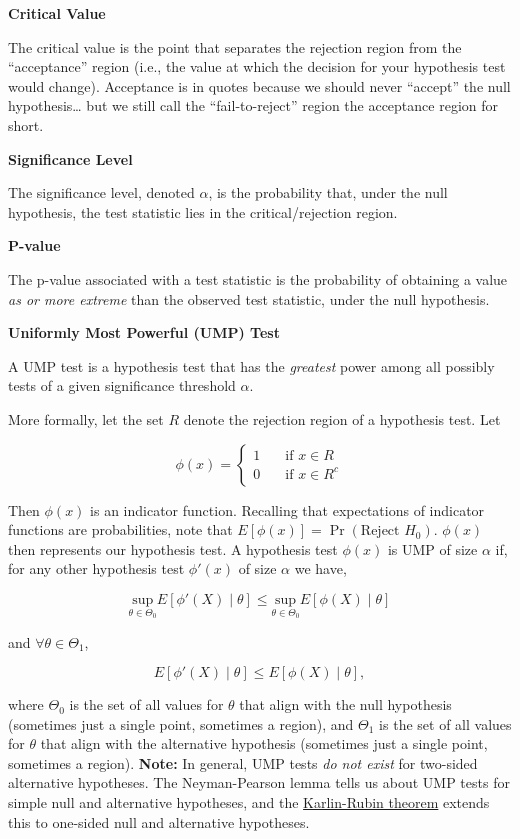 \documentclass[
  letterpaper,
  DIV=11,
  numbers=noendperiod]{scrreprt}
\begin{document}
\textbf{Critical Value}

The critical value is the point that separates the rejection region from
the ``acceptance'' region (i.e., the value at which the decision for
your hypothesis test would change). Acceptance is in quotes because we
should never ``accept'' the null hypothesis\ldots{} but we still call
the ``fail-to-reject'' region the acceptance region for short.

\textbf{Significance Level}

The significance level, denoted \(\alpha\), is the probability that,
under the null hypothesis, the test statistic lies in the
critical/rejection region.

\textbf{P-value}

The p-value associated with a test statistic is the probability of
obtaining a value \emph{as or more extreme} than the observed test
statistic, under the null hypothesis.

\textbf{Uniformly Most Powerful (UMP) Test}

A UMP test is a hypothesis test that has the \emph{greatest} power among
all possibly tests of a given significance threshold \(\alpha\).

More formally, let the set \(R\) denote the rejection region of a
hypothesis test. Let

\[
\phi(x) = \begin{cases} 1 & \quad \text{if } x \in R \\ 0 & \quad \text{if } x \in R^c \end{cases}
\]

Then \(\phi(x)\) is an indicator function. Recalling that expectations
of indicator functions are probabilities, note that
\(E[\phi(x)] = \Pr(\text{Reject } H_0)\). \(\phi(x)\) then represents
our hypothesis test. A hypothesis test \(\phi(x)\) is UMP of size
\(\alpha\) if, for any other hypothesis test \(\phi'(x)\) of size
\(\alpha\) we have,

\[
\underset{\theta \in \Theta_0}{\text{sup}} E[\phi'(X) \mid \theta] \leq \underset{\theta \in \Theta_0}{\text{sup}} E[\phi(X) \mid \theta]
\]

and \(\forall \theta \in \Theta_1\),

\[
E[\phi'(X) \mid \theta] \leq E[\phi(X) \mid \theta],
\]

where \(\Theta_0\) is the set of all values for \(\theta\) that align
with the null hypothesis (sometimes just a single point, sometimes a
region), and \(\Theta_1\) is the set of all values for \(\theta\) that
align with the alternative hypothesis (sometimes just a single point,
sometimes a region). \textbf{Note:} In general, UMP tests \emph{do not
exist} for two-sided alternative hypotheses. The Neyman-Pearson lemma
tells us about UMP tests for simple null and alternative hypotheses, and
the
\href{https://en.wikipedia.org/wiki/Uniformly_most_powerful_test}{Karlin-Rubin
theorem} extends this to one-sided null and alternative hypotheses.
\end{document}
